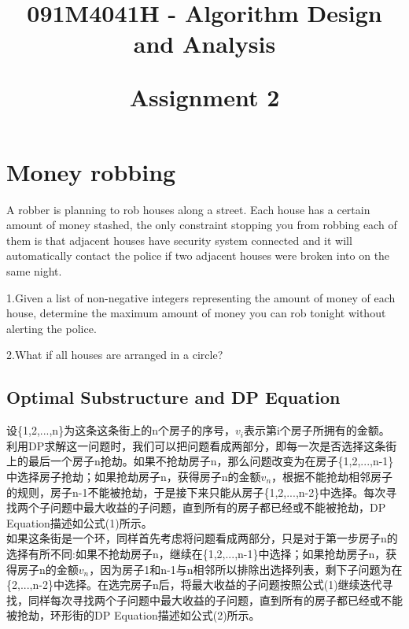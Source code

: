 \documentclass{article}
\begin{document}

\title{091M4041H - Algorithm Design and Analysis\\ [2ex] \begin{large} Assignment 2 \end{large}}

\maketitle

\tableofcontents

\newpage
\section{Money robbing}

A robber is planning to rob houses along a street. Each house has a certain amount of money stashed, the only constraint stopping you from robbing each of them is that adjacent houses have security system connected and it will automatically contact the police if two adjacent houses were broken into on the same night.

1.Given a list of non-negative integers representing the amount of money of each house, determine the maximum amount of money you can rob tonight without alerting the police.

2.What if all houses are arranged in a circle?

\subsection{Optimal Substructure and DP Equation}

设\{1,2,...,n\}为这条这条街上的n个房子的序号，$v_i$表示第i个房子所拥有的金额。
\\

利用DP求解这一问题时，我们可以把问题看成两部分，即每一次是否选择这条街上的最后一个房子n抢劫。如果不抢劫房子n，那么问题改变为在房子\{1,2,...,n-1\}中选择房子抢劫；如果抢劫房子n，获得房子n的金额$v_n$，根据不能抢劫相邻房子的规则，房子n-1不能被抢劫，于是接下来只能从房子\{1,2,...,n-2\}中选择。每次寻找两个子问题中最大收益的子问题，直到所有的房子都已经或不能被抢劫，DP Equation描述如公式(1)所示。
\\

如果这条街是一个环，同样首先考虑将问题看成两部分，只是对于第一步房子n的选择有所不同:如果不抢劫房子n，继续在\{1,2,...,n-1\}中选择；如果抢劫房子n，获得房子n的金额$v_n$，因为房子1和n-1与n相邻所以排除出选择列表，剩下子问题为在\{2,...,n-2\}中选择。在选完房子n后，将最大收益的子问题按照公式(1)继续迭代寻找，同样每次寻找两个子问题中最大收益的子问题，直到所有的房子都已经或不能被抢劫，环形街的DP Equation描述如公式(2)所示。
\end{document}
